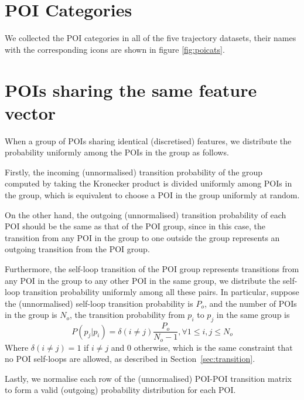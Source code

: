 \newpage

\appendix

\section{POI Categories}
We collected the POI categories in all of the five trajectory datasets,
their names with the corresponding icons are shown in figure \ref{fig:poicats}.


\section{POIs sharing the same feature vector}
When a group of POIs sharing identical (discretised) features,
we distribute the probability uniformly among the POIs in the group as follows.

Firstly, the incoming (unnormalised) transition probability of the group computed by taking 
the Kronecker product is divided uniformly among POIs in the group,
which is equivalent to choose a POI in the group uniformly at random.

On the other hand, the outgoing (unnormalised) transition probability of each POI 
should be the same as that of the POI group, 
since in this case, the transition from any POI in the group to one outside the group 
represents an outgoing transition from the POI group.

Furthermore, the self-loop transition of the POI group represents transitions from any POI in the group
to any other POI in the same group, we distribute the self-loop transition probability uniformly 
among all these pairs.
In particular, suppose the (unnormalised) self-loop transition probability is $P_o$,
and the number of POIs in the group is $N_o$,
the transition probability from $p_i$ to $p_j$ in the same group is
\begin{displaymath}
    P(p_j | p_i) = \delta(i \ne j) \frac{P_o}{N_o - 1}, \forall 1 \le i, j \le N_o
\end{displaymath}
Where $\delta(i \ne j) = 1$ if $i \ne j$ and $0$ otherwise, which is the same constraint that no POI
self-loops are allowed, as described in Section~\ref{sec:transition}.

Lastly, we normalise each row of the (unnormalised) POI-POI transition matrix 
to form a valid (outgoing) probability distribution for each POI.


